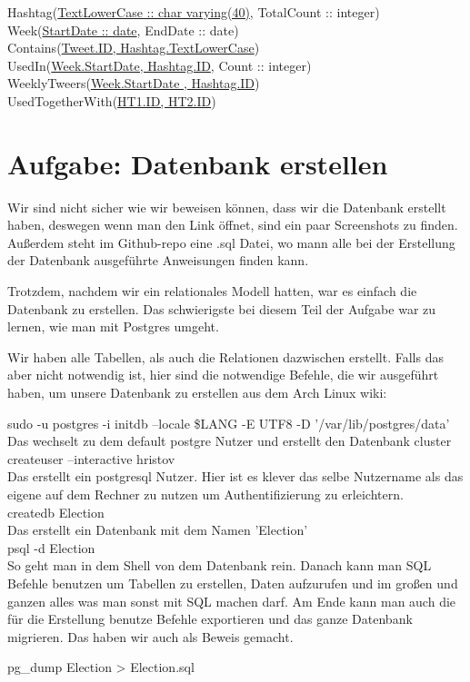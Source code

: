 Hashtag(\underline{TextLowerCase :: char varying(40)}, TotalCount :: integer) \\
Week(\underline{StartDate :: date}, EndDate :: date) \\

Contains(\underline{Tweet.ID, Hashtag.TextLowerCase}) \\
UsedIn(\underline{Week.StartDate, Hashtag.ID}, Count :: integer) \\
WeeklyTweers(\underline{Week.StartDate , Hashtag.ID}) \\ 
UsedTogetherWith(\underline{HT1.ID, HT2.ID}) \\



\section{Aufgabe: Datenbank erstellen}
Wir sind nicht sicher wie wir beweisen können, dass wir die Datenbank erstellt haben, deswegen wenn man den Link öffnet, 
sind ein paar Screenshots zu finden. Außerdem steht im Github-repo eine .sql Datei, wo mann alle bei der Erstellung der Datenbank
ausgeführte Anweisungen finden kann. 

Trotzdem, nachdem wir ein relationales Modell hatten, war es einfach die Datenbank zu erstellen. Das schwierigste bei diesem Teil
der Aufgabe war zu lernen, wie man mit Postgres umgeht.

Wir haben alle Tabellen, als auch die Relationen dazwischen erstellt. Falls das aber nicht notwendig ist, hier sind die notwendige Befehle, die wir ausgeführt haben, um unsere Datenbank zu erstellen aus dem Arch Linux wiki:

sudo -u postgres -i
initdb --locale \$LANG -E UTF8 -D '/var/lib/postgres/data' \\

Das wechselt zu dem default postgre Nutzer und erstellt den Datenbank cluster \\

createuser --interactive hristov \\

Das erstellt ein postgresql Nutzer. Hier ist es klever das selbe Nutzername als das eigene auf dem Rechner zu nutzen um Authentifizierung zu erleichtern. \\

createdb Election \\

Das erstellt ein Datenbank mit dem Namen 'Election' \\

psql -d Election \\

So geht man in dem Shell von dem Datenbank rein. Danach kann man SQL Befehle benutzen um 
Tabellen zu erstellen, Daten aufzurufen und im großen und ganzen alles was man sonst mit SQL machen darf. Am Ende kann man auch die für die Erstellung benutze Befehle exportieren und das ganze Datenbank migrieren. Das haben wir auch als Beweis gemacht.

pg\_dump Election > Election.sql


